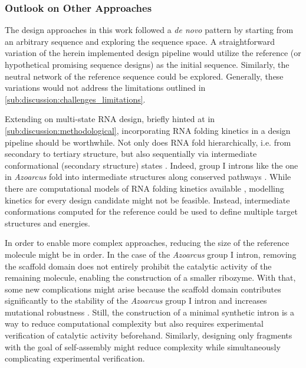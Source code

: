\documentclass[../../master.tex]{subfiles}
\begin{document}
\subsubsection{Outlook on Other Approaches}
\label{ssub:discussion:other_approaches}

The design approaches in this work followed a \textit{de novo} pattern by starting from an arbitrary sequence and exploring the sequence space.
A straightforward variation of the herein implemented design pipeline would utilize the reference (or hypothetical promising sequence designs) as the initial sequence.
Similarly, the neutral network of the reference sequence could be explored.
Generally, these variations would not address the limitations outlined in \autoref{sub:discussion:challenges_limitations}.

Extending on multi-state RNA design, briefly hinted at in \autoref{sub:discussion:methodological}, incorporating RNA folding kinetics in a design pipeline should be worthwhile.
Not only does RNA fold hierarchically, i.e. from secondary to tertiary structure, but also sequentially via intermediate conformational (secondary structure) states \parencite{tinoco_how_1999}.
Indeed, group I introns like the one in \textit{Azoarcus} fold into intermediate structures along conserved pathways \parencite{mitra_rna_2011}.
While there are computational models of RNA folding kinetics available \parencite{kucharik_basin_2014, kucharik_pseudoknots_2016}, modelling kinetics for every design candidate might not be feasible.
Instead, intermediate conformations computed for the reference could be used to define multiple target structures and energies.

In order to enable more complex approaches, reducing the size of the reference molecule might be in order.
In the case of the \textit{Azoarcus} group I intron, removing the scaffold domain does not entirely prohibit the catalytic activity of the remaining molecule, enabling the construction of a smaller ribozyme.
With that, some new complications might arise because the scaffold domain contributes significantly to the stability of the \textit{Azoarcus} group I intron and increases mutational robustness \parencite{hayden_intramolecular_2015}.
Still, the construction of a minimal synthetic intron is a way to reduce computational complexity but also requires experimental verification of catalytic activity beforehand.
Similarly, designing only fragments with the goal of self-assembly might reduce complexity while simultaneously complicating experimental verification.
\end{document}
